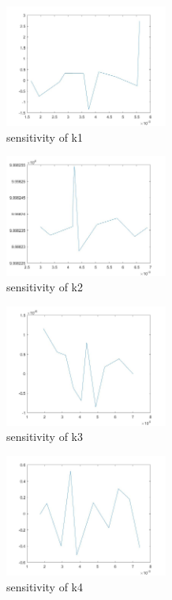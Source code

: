 \begin{figure}[H]
	\centering
	\begin{subfigure}{0.5\textwidth}
		\includegraphics[height=4cm]{s1.jpg}
		\caption{sensitivity of k1}
	\end{subfigure}%
	\begin{subfigure}{0.5\textwidth}
		\includegraphics[height=4cm]{s2.jpg}
		\caption{sensitivity of k2}
	\end{subfigure}
	\begin{subfigure}{0.5\textwidth}
		\includegraphics[height=4cm]{s3.jpg}
		\caption{sensitivity of k3}
	\end{subfigure}%
	\begin{subfigure}{0.5\textwidth}
		\includegraphics[height=4cm]{s4.jpg}
		\caption{sensitivity of k4}
	\end{subfigure}
	\begin{subfigure}{0.5\textwidth}

\end{subfigure}
\end{figure}
